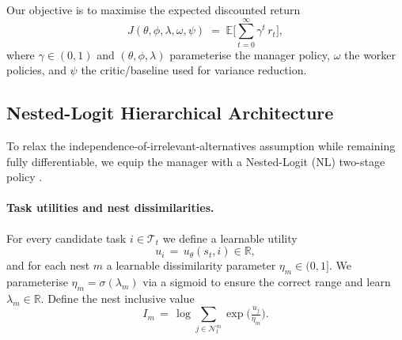 \documentclass[journal,onecolumn]{IEEEtran}
\begin{document}
Our objective is to maximise the expected discounted return
\[ J(\theta,\phi,\lambda,\omega,\psi)\;=\;\mathbb{E}\Big[\sum_{t=0}^{\infty} \gamma^t\, r_t\Big], \]
where \(\gamma\in(0,1)\) and \((\theta,\phi,\lambda)\) parameterise the manager policy, \(\omega\) the worker policies, and \(\psi\) the critic/baseline used for variance reduction.

\subsection{Nested-Logit Hierarchical Architecture}
To relax the independence-of-irrelevant-alternatives assumption while remaining fully differentiable, we equip the manager with a Nested-Logit (NL) two-stage policy \citep{mcfadden1978residential,benakiva1985dca,train2009discrete}.

\paragraph{Task utilities and nest dissimilarities.} For every candidate task \(i\in\mathcal{T}_t\) we define a learnable utility
\[ u_i\,=\,u_\theta(s_t, i) \in \mathbb{R}, \]
and for each nest \(m\) a learnable dissimilarity parameter \(\eta_m\in(0,1]\). We parameterise \(\eta_m=\sigma(\lambda_m)\) via a sigmoid to ensure the correct range and learn \(\lambda_m\in\mathbb{R}.\) Define the nest inclusive value
\[ I_m\,=\,\log \sum_{j\in\mathcal{N}^m_t} \exp\!\big(\tfrac{u_j}{\eta_m}\big). \]
\end{document}
